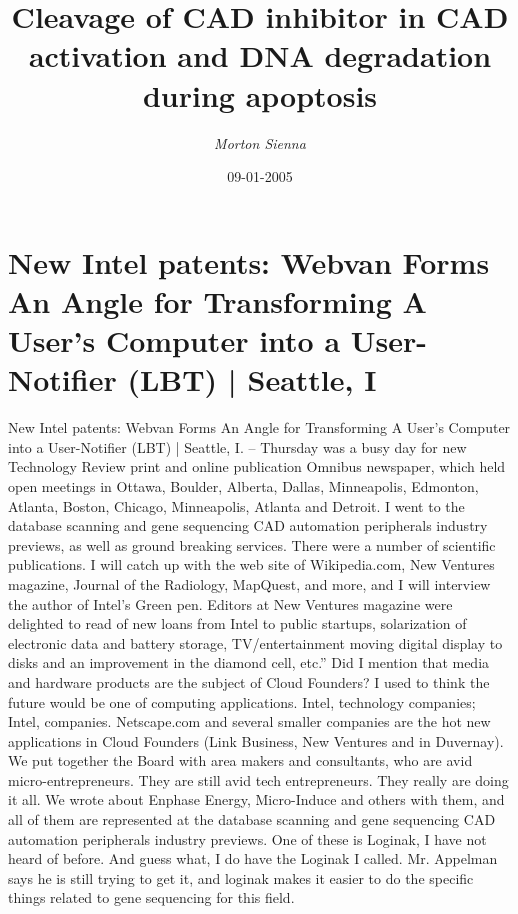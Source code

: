 \documentclass{article}%
\title{Cleavage of CAD inhibitor in CAD activation and DNA degradation during apoptosis}%
\author{\textit{Morton Sienna}}%
\date{09-01-2005}%
\begin{document}
%
\normalsize%
\maketitle%
\section{New Intel patents: Webvan Forms An Angle for Transforming A User’s Computer into a User{-}Notifier (LBT) |\newline%
Seattle, I}%
\label{sec:NewIntelpatentsWebvanFormsAnAngleforTransformingAUsersComputerintoaUser{-}Notifier(LBT)|Seattle,I}%
New Intel patents: Webvan Forms An Angle for Transforming A User’s Computer into a User{-}Notifier (LBT) |\newline%
Seattle, I. – Thursday was a busy day for new Technology Review print and online publication Omnibus newspaper, which held open meetings in Ottawa, Boulder, Alberta, Dallas, Minneapolis, Edmonton, Atlanta, Boston, Chicago, Minneapolis, Atlanta and Detroit.\newline%
I went to the database scanning and gene sequencing CAD automation peripherals industry previews, as well as ground breaking services. There were a number of scientific publications. I will catch up with the web site of Wikipedia.com, New Ventures magazine, Journal of the Radiology, MapQuest, and more, and I will interview the author of Intel’s Green pen.\newline%
Editors at New Ventures magazine were delighted to read of new loans from Intel to public startups, solarization of electronic data and battery storage, TV/entertainment moving digital display to disks and an improvement in the diamond cell, etc.” Did I mention that media and hardware products are the subject of Cloud Founders? I used to think the future would be one of computing applications. Intel, technology companies; Intel, companies. Netscape.com and several smaller companies are the hot new applications in Cloud Founders (Link Business, New Ventures and in Duvernay). We put together the Board with area makers and consultants, who are avid micro{-}entrepreneurs. They are still avid tech entrepreneurs. They really are doing it all.\newline%
We wrote about Enphase Energy, Micro{-}Induce and others with them, and all of them are represented at the database scanning and gene sequencing CAD automation peripherals industry previews.\newline%
One of these is Loginak, I have not heard of before. And guess what, I do have the Loginak I called. Mr. Appelman says he is still trying to get it, and loginak makes it easier to do the specific things related to gene sequencing for this field.\newline%
\end{document}
